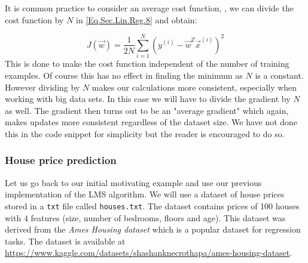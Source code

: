 \begin{observation}
It is common practice to consider an average cost function, \ie, we can divide the cost function by $N$ in \cref{Eq.Sec.Lin.Reg.8} and obtain:  

\begin{equation}\label{Eq.Sec.Lin.Reg.9}
	J(\vec{w}) = \frac{1}{2N}\sum_{i=1}^{N} (y^{(i)} - \vec{w}^T \vec{x}^{(i)})^2
\end{equation}
This is done to make the cost function independent of the number of training examples. Of course this has no effect in finding the minimum as $N$ is a constant. However dividing by $N$ makes our calculations more consistent, especially when working with big data sets.  In this case we will have to divide the gradient by $N$ as well. The gradient then turns out to be an "average gradient" which again, makes updates more consistent regardless of the dataset size. We have not done this in the code snippet for simplicity but the reader is encouraged to do so. 
\end{observation}

\subsubsection{House price prediction}

Let us go back to our initial motivating example and use our previous implementation of the LMS algorithm. We will use a dataset of house prices stored in a \texttt{txt} file called \texttt{houses.txt}. The dataset contains prices of 100 houses with $4$ features (size, number of bedrooms, floors and age). This dataset was derived from the \emph{Ames Housing dataset} which is a popular dataset for regression tasks. The dataset is available at \url{https://www.kaggle.com/datasets/shashanknecrothapa/ames-housing-dataset}. 